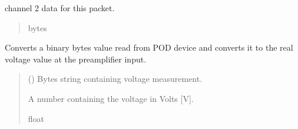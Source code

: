 \documentclass[letterpaper,10pt,english]{sphinxmanual}
\begin{document}
\begin{fulllineitems}
\begin{fulllineitems}
\begin{quote}
\begin{description}
\end{description}\end{quote}

\end{fulllineitems}


\begin{fulllineitems}
\label{\detokenize{PodApi.Packets:PodApi.Packets.Binary4.PacketBinary4.ch2}}
\pysigstartsignatures
{}
\pysigstopsignatures
\sphinxAtStartPar
channel 2 data for this packet.
\begin{quote}\begin{description}
\sphinxAtStartPar
bytes

\end{description}\end{quote}

\end{fulllineitems}


\begin{fulllineitems}
\label{\detokenize{PodApi.Packets:PodApi.Packets.Binary4.PacketBinary4.BinaryBytesToVoltage}}
\pysigstartsignatures
{}
\pysigstopsignatures
\sphinxAtStartPar
Converts a binary bytes value read from POD device and converts it to the         real voltage value at the preamplifier input.
\begin{quote}\begin{description}
\sphinxAtStartPar
{} () \textendash{} Bytes string containing voltage measurement.

\sphinxAtStartPar
A number containing the voltage in Volts {[}V{]}.

\sphinxAtStartPar
float


\end{description}
\end{quote}
\end{fulllineitems}
\end{fulllineitems}
\end{document}
